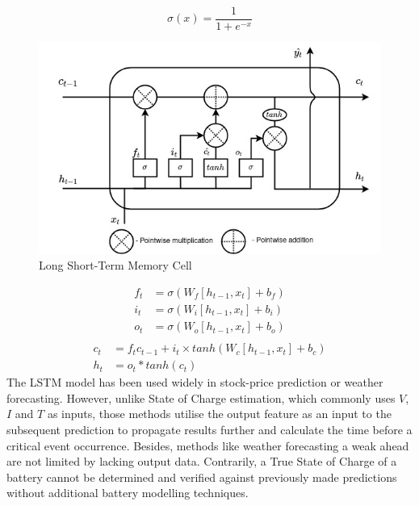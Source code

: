 %
%
\begin{equation}
    \sigma(x) = \frac{1}{1+e^{-x}}
    \label{eq:sigmoid2}
\end{equation}
\begin{figure}[htbp]
    \centering
    \includegraphics[width=\linewidth]{II_Body/LSTM/images/LSTM.jpg}
    \caption{Long Short-Term Memory Cell}
    \label{fig:LSTM-cell2}
\end{figure}
\begin{equation}
    \begin{split}
        f_t &= \sigma \left(W_f \left[h_{t-1}, x_t \right] + b_f \right) \\
        i_t &= \sigma \left(W_i \left[h_{t-1}, x_t \right] + b_i \right) \\
        o_t &= \sigma \left(W_o \left[h_{t-1}, x_t \right] + b_o \right) \\    
    \end{split}
    \label{eq:LSTM-gates2}
\end{equation}
\begin{equation}
    \begin{split}
        c_t &= f_t c_{t-1}+i_t \times tanh \left(W_c \left[h_{t-1}, x_t \right] + b_c \right) \\
        h_t &= o_t*tanh \left(c_t \right)
    \end{split}
    \label{eq:LSTM-output2}
\end{equation}
The LSTM model has been used widely in stock-price prediction or weather forecasting.
However, unlike State of Charge estimation, which commonly uses $V$, $I$ and $T$ as inputs, those methods utilise the output feature as an input to the subsequent prediction to propagate results further and calculate the time before a critical event occurrence.
Besides, methods like weather forecasting a weak ahead are not limited by lacking output data. 
Contrarily, a True State of Charge of a battery cannot be determined and verified against previously made predictions without additional battery modelling techniques.

